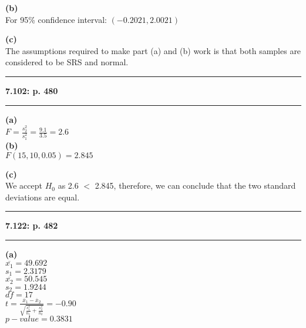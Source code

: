 \documentclass[11pt]{article}
\newcommand\question[2]{\vspace{.25in}\hrule\textbf{#1: #2}\vspace{.5em}\hrule\vspace{.10in}}
\renewcommand\part[1]{\vspace{.10in}\textbf{(#1)}}
\begin{document}
	\part{b}\\
		For 95\% confidence interval: $(-0.2021, 2.0021)$
	
	\part{c}\\
		The assumptions required to make part (a) and (b) work is that both samples are considered to be SRS and normal.


\question{7.102}{p. 480}

\part{a}\\
		
		$F = \frac{s_{2}^{2}}{s_{1}^{2}} = \frac{9.1}{3.5} = 2.6$\\
		
\part{b}\\
	$F(15, 10, 0.05) = 2.845$

\part{c}\\
	We accept $H_{0}$ as 2.6 $<$ 2.845, therefore, we can conclude that the two standard deviations are equal.

\question{7.122}{p. 482}

\part{a}\\
	$\overline{x_{1}}=49.692$\\
	$s_{1} = 2.3179$\\
	$\overline{x_{2}}=50.545$\\
	$s_{2} = 1.9244$\\
	$df = 17$\\
	$t = \frac{\overline{x}_{1} - \overline{x}_{2}} {\sqrt {\frac{s_{1}^{2}}{n_{1}}+\frac{s_{2}^{2}}{n_{2}}}} = -0.90$\\
	$p-value=0.3831$
\end{document}
